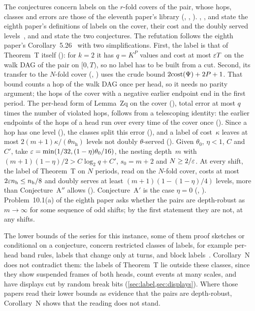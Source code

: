 \begin{outline}
The conjectures concern labels on the $r$-fold covers of the pair, whose hops, classes and errors are those of the eleventh
paper's library (, , ).
, ,  and  state the eighth paper's
definitions of labels on the cover, their cost and the doubly served levels~\cite[Section~2.5]{EighthPaper2026}, and
 and  state the two conjectures. The refutation follows the eighth paper's
Corollary~5.26~\cite{EighthPaper2026} with two simplifications. First, the label is that of Theorem~T itself
(): for $k=2$ it has $q=K^P$ values and cost at most $\varepsilon T$ on the walk DAG of the pair on $[0,T)$, so no
label has to be built from a cut. Second, its transfer to the $N$-fold cover (, )
uses the crude bound $2\mathrm{cost}(\Psi)+2P+1$. That bound counts a hop of the walk DAG once per head, so it needs no parity argument;
the hops of the cover with a negative earlier endpoint end in the first period. The per-head form of Lemma~Zq on the cover
(), total error at most $q$ times the number of violated hops, follows from a telescoping identity: the
earlier endpoints of the hops of a head run over every time of the cover once (). Since a hop has one level
(), the classes split this error (), and a label of cost~$\kappa$
leaves at most $2(m+1)\kappa/(\theta n_{\mathrm h})$ levels not doubly $\theta$-served (). Given
$\theta_0$, $\eta<1$, $C$ and~$C'$, take $\varepsilon=\min(1/32,(1-\eta)\theta_0/16)$, the nesting depth~$m$ with
$(m+1)(1-\eta)/2>C\log_2q+C'$, $s_0=m+2$ and $N\ge2/\varepsilon$. At every shift, the label of Theorem~T on $N$ periods, read on
the $N$-fold cover, costs at most $2\varepsilon n_{\mathrm h}\le n_{\mathrm h}/8$ and doubly serves at least
$(m+1)(1-(1-\eta)/4)$ levels, more than Conjecture~A$''$ allows (). Conjecture~A$'$ is the case
$\eta=0$ (, ). Problem~10.1(a) of the eighth paper asks whether the
pairs are depth-robust as $m\to\infty$ for some sequence of odd shifts; by the first statement they are not, at any shifts.
\end{outline}

The lower bounds of the series for this instance, some of them proof sketches or conditional on a conjecture, concern
restricted classes of labels, for example per-head band rules, labels that change only at turns, and block
labels~\cite{FourthPaper2026,EighthPaper2026,DirectedReciprocity2026,MergeDepth2026}. Corollary~N does not contradict them: the
labels of Theorem~T lie outside these classes, since they show suspended frames of both heads, count events at many scales,
and have displays cut by random break bits (\cref{sec:label,sec:displays}). Where those papers read their lower bounds as
evidence that the pairs are depth-robust, Corollary~N shows that the reading does not stand.

